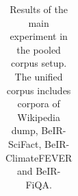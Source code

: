 \documentclass[11pt]{article}
\begin{document}
\begin{table}
{\begin{tabular}{l|cccccc|cccc}
     \bottomrule
\end{tabular}
}
    \caption{Results of the main experiment in the pooled corpus setup. The unified corpus includes corpora of Wikipedia dump, BeIR-SciFact, BeIR-ClimateFEVER and BeIR-FiQA.}
    \label{tab:tb-13}
\end{table}
\end{document}
